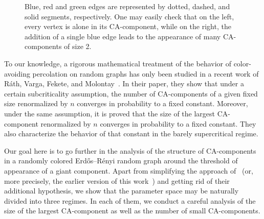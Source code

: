 \documentclass[10pt]{amsart}
\theoremstyle{definition}\newtheorem{defi}[theo]{Definition}\newtheorem{rema}[theo]{Remark}\newtheorem{exam}[theo]{Example}\newtheorem{exem}[theo]{Example}\newtheorem{nota}[theo]{Notation}
\begin{document}
\begin{figure}
\caption{Blue, red and green edges are represented by dotted, dashed, and solid segments, respectively. One may easily check that on the left, every vertex is alone in its CA-component, while on the right, the addition of a single blue edge leads to the appearance of many CA-components of size 2.}\label{fig 1}
\end{figure}

To our knowledge, a rigorous mathematical treatment of the behavior of color-avoiding percolation on random graphs has only been studied in a recent work of Ráth, Varga, Fekete, and Molontay~\cite{RVFM22}. In their paper, they show that under a certain subcriticality assumption, the number of CA-components of a given fixed size renormalized by $n$ converges in probability to a fixed constant. Moreover, under the same assumption, it is proved that the size of the largest CA-component renormalized by $n$ converges in probability to a fixed constant. They also characterize the behavior of that constant in the barely supercritical regime.

Our goal here is to go further in the analysis of the structure of CA-components in a randomly colored Erd\H{o}s--Rényi random graph around the threshold of appearance of a giant component. Apart from simplifying the approach of~\cite{RVFM22} (or, more precisely, the earlier version of this work~\cite{RVFM22.0}) and getting rid of their additional hypothesis, we show that the parameter space may be naturally divided into three regimes. In each of them, we conduct a careful analysis of the size of the largest CA-component as well as the number of small CA-components.
\end{document}
